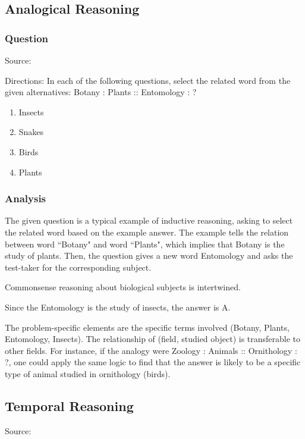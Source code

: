 \documentclass[12pt, a4paper]{article}
\begin{document}
\subsection*{Analogical Reasoning}
\subsubsection*{Question}
Source: \cite{Gajanand_2022b}

Directions: In each of the following questions, select the related word from the given alternatives: Botany : Plants :: Entomology : ?

\begin{enumerate}[label=(\Alph*)]
    \item Insects
    \item Snakes
    \item Birds
    \item Plants
\end{enumerate}

\subsubsection*{Analysis}
The given question is a typical example of inductive reasoning, asking to select the related word based on the example answer. The example tells the relation between word ``Botany" and word ``Plants", which implies that Botany is the study of plants. Then, the question gives a new word Entomology and asks the test-taker for the corresponding subject.

Commonsense reasoning about biological subjects is intertwined.

Since the Entomology is the study of insects, the answer is A.

The problem-specific elements are the specific terms involved (Botany, Plants, Entomology, Insects). The relationship of (field, studied object) is transferable to other fields. For instance, if the analogy were Zoology : Animals :: Ornithology : ?, one could apply the same logic to find that the answer is likely to be a specific type of animal studied in ornithology (birds).

\subsection*{Temporal Reasoning}
Source: \cite{Singh_2020}
\end{document}
